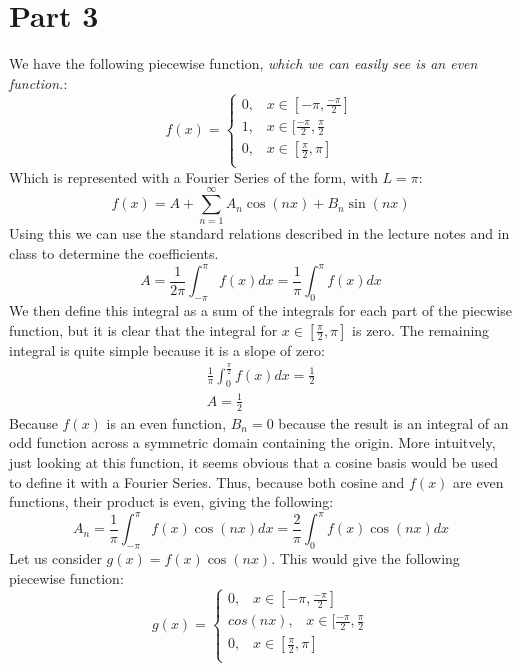 \documentclass{article}
\begin{document}
\section*{Part 3}
We have the following piecewise function, \textit{which we can easily see is an even function.}:
\[f(x)=
  \begin{cases}
			0, \; \; \; x \in [-\pi, \frac{-\pi}{2}] \\
			1, \; \; \; x \in [\frac{-\pi}{2} , \frac{\pi}{2}\\
			0, \; \; \; x \in [\frac{\pi}{2}, \pi] \\
            \end{cases}
\]
Which is represented with a Fourier Series of the form, with $L = \pi$:
\begin{equation}
f(x) = A + \sum_{n=1}^{\infty} A_n\cos(nx) + B_n\sin(nx)
\end{equation}
Using this we can use the standard relations described in the lecture notes and in class to determine the coefficients.
\begin{equation}
A = \frac{1}{2\pi} \int_{-\pi}^{\pi}f(x)dx = \frac{1}{\pi}\int_0^{\pi}f(x)dx
\end{equation}
We then define this integral as a sum of the integrals for each part of the piecwise function, but it is clear that the integral for $x\in [\frac{\pi}{2}, \pi]$ is zero. The remaining integral is quite simple because it is a slope of zero:
\begin{equation}
\begin{aligned}
\frac{1}{\pi}\int_0^{\frac{\pi}{2}}f(x)dx = \frac{1}{2}\\
A = \frac{1}{2}
\end{aligned}
\end{equation}
Because $f(x)$ is an even function, $B_n = 0$ because the result is an integral of an odd function across a symmetric domain containing the origin. More intuitvely, just looking at this function, it seems obvious that a cosine basis would be used to define it with a Fourier Series. Thus, because both cosine and $f(x)$ are even functions, their product is even, giving the following:
\begin{equation}
A_n = \frac{1}{\pi} \int_{-\pi}^{\pi}f(x)\cos(nx)dx = \frac{2}{\pi}\int_0^{\pi}f(x)\cos(nx)dx
\end{equation}
Let us consider $g(x) = f(x)\cos(nx)$. This would give the following piecewise function:
\[g(x)=
  \begin{cases}
			0, \; \; \; x \in [-\pi, \frac{-\pi}{2}] \\
			cos(nx), \; \; \; x \in [\frac{-\pi}{2} , \frac{\pi}{2}\\
			0, \; \; \; x \in [\frac{\pi}{2}, \pi] \\
            \end{cases}
\]
\end{document}

